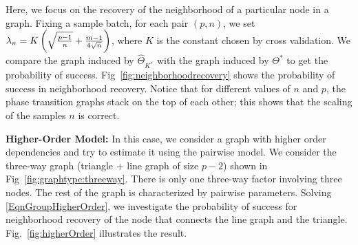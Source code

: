 
{} Here, we focus on the recovery of the neighborhood of a particular node in a graph. Fixing a sample batch, for each pair $(p,n)$, we set $\regpar_n=K\left(\sqrt{\frac{p-1}{n}}+\frac{m-1}{4\sqrt{n}}\right)$, where $K$ is the constant chosen by cross validation. We compare the graph induced by $\widehat{\Theta}_{K^*}$ with the graph induced by $\Theta^*$ to get the probability of success. Fig~\ref{fig:neighborhoodrecovery} shows the probability of success in neighborhood recovery. Notice that for different values of $n$ and $p$, the phase transition graphs stack on the top of each other; this shows that the scaling of the samples $n$ is correct.



{\bf Higher-Order Model:} In this case, we consider a graph with higher order dependencies and try to estimate it using the pairwise model. We consider the three-way graph (triangle + line graph of size $p-2$) shown in Fig~\ref{fig:graphtype:threeway}. There is only one three-way factor involving three nodes. The rest of the graph is characterized by pairwise parameters. Solving \eqref{EqnGroupHigherOrder}, we investigate the probability of success for neighborhood recovery of the node that connects the line graph and the triangle. Fig.~\ref{fig:higherOrder} illustrates the result.

